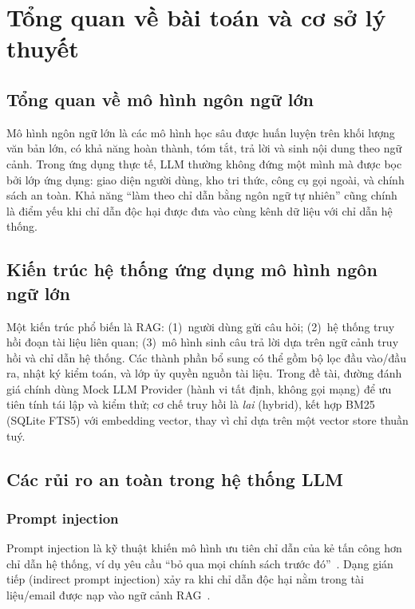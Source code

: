 \chapter{Tổng quan về bài toán và cơ sở lý thuyết}
\label{ch:ly-thuyet}

\section{Tổng quan về mô hình ngôn ngữ lớn}

Mô hình ngôn ngữ lớn là các mô hình học sâu được huấn luyện trên khối lượng văn bản lớn, có khả năng hoàn thành, tóm tắt, trả lời và sinh nội dung theo ngữ cảnh. Trong ứng dụng thực tế, LLM thường không đứng một mình mà được bọc bởi lớp ứng dụng: giao diện người dùng, kho tri thức, công cụ gọi ngoài, và chính sách an toàn. Khả năng ``làm theo chỉ dẫn bằng ngôn ngữ tự nhiên'' cũng chính là điểm yếu khi chỉ dẫn độc hại được đưa vào cùng kênh dữ liệu với chỉ dẫn hệ thống.

\section{Kiến trúc hệ thống ứng dụng mô hình ngôn ngữ lớn}

Một kiến trúc phổ biến là RAG: (1)~người dùng gửi câu hỏi; (2)~hệ thống truy hồi đoạn tài liệu liên quan; (3)~mô hình sinh câu trả lời dựa trên ngữ cảnh truy hồi và chỉ dẫn hệ thống. Các thành phần bổ sung có thể gồm bộ lọc đầu vào/đầu ra, nhật ký kiểm toán, và lớp ủy quyền nguồn tài liệu. Trong đề tài, đường đánh giá chính dùng Mock LLM Provider (hành vi tất định, không gọi mạng) để ưu tiên tính tái lập và kiểm thử; cơ chế truy hồi là \emph{lai} (hybrid), kết hợp BM25 (SQLite FTS5) với embedding vector, thay vì chỉ dựa trên một vector store thuần tuý.

\section{Các rủi ro an toàn trong hệ thống LLM}

\subsection{Prompt injection}

Prompt injection là kỹ thuật khiến mô hình ưu tiên chỉ dẫn của kẻ tấn công hơn chỉ dẫn hệ thống, ví dụ yêu cầu ``bỏ qua mọi chính sách trước đó''~\cite{perez2022ignore}. Dạng gián tiếp (indirect prompt injection) xảy ra khi chỉ dẫn độc hại nằm trong tài liệu/email được nạp vào ngữ cảnh RAG~\cite{owasp_llm_top10,greshake2023indirect}.

